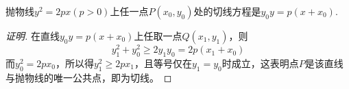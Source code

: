 \begin{theorem}
  抛物线$y^2=2px(p>0)$上任一点$P(x_0,y_0)$处的切线方程是$y_0y=p(x+x_0)$.
\end{theorem}

\begin{proof}[证明]
  在直线$y_0y=p(x+x_0)$上任取一点$Q(x_1,y_1)$，则
  \[ y_1^2+y_0^2 \geqslant 2y_1y_0=2p(x_1+x_0) \]
  而$y_0^2=2px_0$，所以得$y_1^2 \geqslant 2px_1$，且等号仅在$y_1=y_0$时成立，这表明点$P$是该直线与抛物线的唯一公共点，即为切线。
\end{proof}

